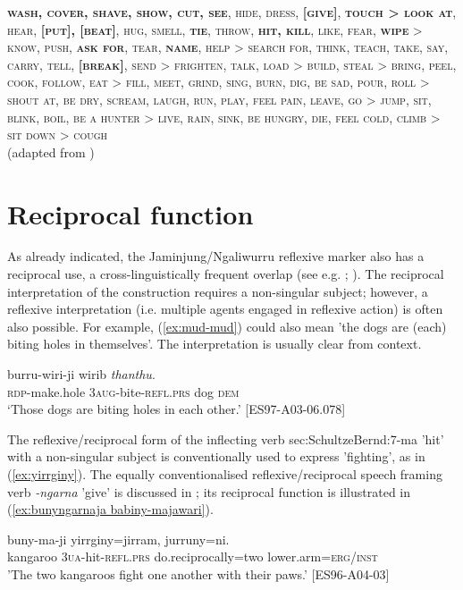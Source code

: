 \documentclass[output=paper,colorlinks,citecolor=brown]{langscibook}
\begin{document}
\ea
\textsc{\textbf{wash, cover, shave, show, cut, see}, hide, dress, \textbf{[give]}, \textbf{touch > look at}, hear, \textbf{[put], [beat]}, hug, smell, \textbf{tie}, throw, \textbf{hit, kill}, like, fear, \textbf{wipe} > know, push, \textbf{ask for}, tear, \textbf{name}, help > search for, think, teach, take, say, carry, tell, \textbf{[break]}, send > frighten, talk, load > build, steal > bring, peel, cook, follow, eat > fill, meet, grind, sing, burn, dig, be sad, pour, roll > shout at, be dry, scream, laugh, run, play, feel pain, leave, go > jump, sit, blink, boil, be a hunter > live, rain, sink, be hungry, die, feel cold, climb > sit down > cough} \\
(adapted from \citealt[169]{Wichmann2015})
\label{ex:verb-hierarchy}
\z

\section{Reciprocal function} \label{sec:SchultzeBernd:5}

As already indicated, the Jaminjung/Ngaliwurru reflexive marker also has a reciprocal use, a cross-linguistically frequent overlap (see e.g. \citealt[17]{Nedjalkov2007Overview}; \citealt{MaslovaNedjalkov2013}). The reciprocal interpretation of the construction requires a non-singular subject; however, a reflexive interpretation (i.e. multiple agents engaged in reflexive action) is often also possible. For example, (\ref{ex:mud-mud}) could also mean 'the dogs are (each) biting holes in themselves'. The interpretation is usually clear from context. 

\ea
{} {burru-wiri-ji} {wirib} \textit{thanthu}. \\
\textsc{rdp-}make.hole \textsc{3aug}-bite-\textsc{refl.prs} dog \textsc{dem} \\
\glt `Those dogs are biting holes in each other.' [ES97-A03-06.078]
\label{ex:mud-mud}
\z

The reflexive/reciprocal form of the inflecting verb sec:SchultzeBernd:7{-ma} 'hit' with a non-singular subject is conventionally used to express 'fighting', as in (\ref{ex:yirrginy}). The equally conventionalised reflexive/reciprocal speech framing verb \textit{-ngarna} 'give' is discussed in ; its reciprocal function is illustrated in (\ref{ex:bunyngarnaja babiny-majawari}).

\ea
{} {buny-ma-ji} {yirrginy=jirram}, {jurruny=ni}. \\
kangaroo \textsc{3ua}-hit-\textsc{refl.prs} do.reciprocally=two lower.arm=\textsc{erg/inst} \\
\glt 'The two kangaroos fight one another with their paws.' [ES96-A04-03]
\label{ex:yirrginy}
\z
\end{document}
